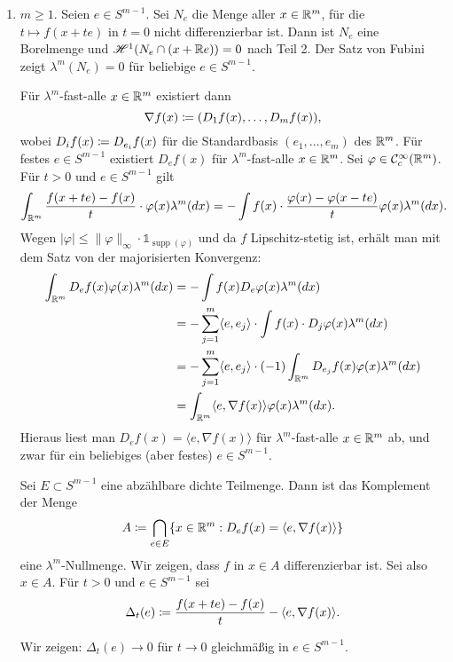 \documentclass[a4paper,twoside,DIV15,BCOR12mm]{scrbook}
\newcommand{\ind}{\mathds 1}
\newcommand{\HM}{\mathscr H}
\DeclareMathOperator{\supp}{supp}
\begin{document}
\begin{beweis}
\begin{enumerate}[{Teil} 1:]
\item $m\ge 1$. Seien $e\in S^{m-1}$. Sei $N_e$ die Menge aller $x\in\mathbb{R}^m$, für die $t \mapsto f(x+te)$ in $t=0$ nicht differenzierbar ist. Dann ist $N_e$ eine Borelmenge und $\HM^1(N_e \cap (x+\MdR e)) = 0$ nach Teil 2. Der Satz von Fubini zeigt $\lambda^m(N_e) = 0$ für beliebige $e\in S^{m-1}$.

Für $\lambda^m$-fast-alle $x\in\mathbb{R}^m$ existiert dann 
\[
\nabla f(x) \da (D_1 f(x), \ldots, D_mf(x)),
\]
wobei $D_if(x) \da D_{e_i}f(x)$ für die Standardbasis $(e_1,\ldots,e_m)$ des $\mathbb{R}^m$. Für festes $e\in S^{m-1}$ existiert $D_ef(x)$ für $\lambda^m$-fast-alle $x\in\mathbb{R}^m$. Sei $\varphi \in\mathcal C^\infty_c(\mathbb{R}^m)$. Für $t>0$ und $e\in S^{m-1}$ gilt
\[
\int_{\mathbb{R}^m} \frac{f(x+t e) - f(x)}{t} \cdot \varphi(x) \lambda^m(dx)
= 
-\int f(x) \cdot \frac{\varphi(x) - \varphi(x-t e)}{t}\varphi(x) \lambda^m(dx).
\]
Wegen $|\varphi| \le \|\varphi\|_\infty \cdot \ind_{\supp(\varphi)}$ und da $f$ Lipschitz-stetig ist, erhält man   mit dem Satz von der majorisierten Konvergenz:
\begin{align*}
\int_{\mathbb{R}^m} D_ef(x) \varphi(x) \lambda^m(dx)
&= -\int f(x) D_e\varphi(x) \lambda^m(dx) \\
&= - \sum_{j=1}^m \langle e, e_j\rangle \cdot \int f(x) \cdot D_j \varphi(x)\lambda^m(dx) \\
&= - \sum_{j=1}^m \langle e, e_j\rangle \cdot (-1) \int_{\mathbb{R}^m} D_{e_j} f(x) \varphi(x) \lambda^m(dx) \\
&= \int_{\mathbb{R}^m} \langle e, \nabla f(x) \rangle \varphi(x) \lambda^m(dx).
\end{align*}
Hieraus liest man $D_ef(x) = \langle e,\nabla f(x) \rangle$ für $\lambda^m$-fast-alle $x\in\mathbb{R}^m$ ab, und zwar   
für ein beliebiges (aber festes) $e\in S^{m-1}$.

Sei $E\subset S^{m-1}$ eine abzählbare dichte Teilmenge. Dann ist das Komplement der Menge 
\[
A \da \bigcap_{e\in E}\{x\in\MdR^m : D_ef(x) = \langle e, \nabla f(x) \rangle\}
\]
eine $\lambda^m$-Nullmenge. Wir zeigen, dass $f$ in $x\in A$ differenzierbar ist. Sei also $x\in A$. Für $t>0$ und $e\in S^{m-1}$ sei
\[
\Delta_t(e) \da \frac{f(x+t e)- f(x)}{t} - \langle e,\nabla f(x) \rangle.
\]

Wir zeigen: $\Delta_t(e) \to 0$ für $t\to 0$ gleichmäßig in $e\in S^{m-1}$.


\end{enumerate}
\end{beweis}
\end{document}
